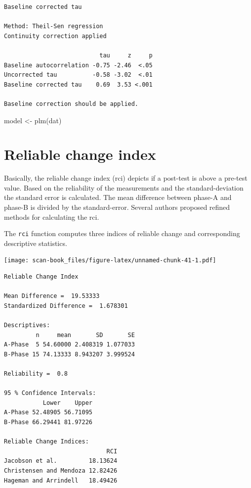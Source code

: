 \documentclass[
]{book}
\newenvironment{Shaded}{\begin{snugshade}}{\end{snugshade}}
\newcommand{\AttributeTok}[1]{\textcolor[rgb]{0.77,0.63,0.00}{#1}}
\newcommand{\ConstantTok}[1]{\textcolor[rgb]{0.00,0.00,0.00}{#1}}
\newcommand{\FloatTok}[1]{\textcolor[rgb]{0.00,0.00,0.81}{#1}}
\newcommand{\FunctionTok}[1]{\textcolor[rgb]{0.00,0.00,0.00}{#1}}
\newcommand{\NormalTok}[1]{#1}
\newcommand{\OtherTok}[1]{\textcolor[rgb]{0.56,0.35,0.01}{#1}}
\newcommand{\SpecialCharTok}[1]{\textcolor[rgb]{0.00,0.00,0.00}{#1}}
\begin{document}
\begin{verbatim}
Baseline corrected tau

Method: Theil-Sen regression
Continuity correction applied

                           tau     z     p
Baseline autocorrelation -0.75 -2.46  <.05
Uncorrected tau          -0.58 -3.02  <.01
Baseline corrected tau    0.69  3.53 <.001

Baseline correction should be applied.
\end{verbatim}

\begin{Shaded}
\begin{Highlighting}[]
\NormalTok{model }\OtherTok{\textless{}{-}} \FunctionTok{plm}\NormalTok{(dat)}
\end{Highlighting}
\end{Shaded}

\hypertarget{reliable-change-index}{%
\section{Reliable change index}\label{reliable-change-index}}

Basically, the reliable change index (rci) depicts if a post-test is above a pre-test value. Based on the reliability of the measurements and the standard-deviation the standard error is calculated. The mean difference between phase-A and phase-B is divided by the standard-error. Several authors proposed refined methods for calculating the rci.

The \texttt{rci} function computes three indices of reliable change \citep{wise_methods_2004} and corresponding descriptive statistics.

\begin{Shaded}
\end{Shaded}

\texttt{[image: scan-book\_files/figure-latex/unnamed-chunk-41-1.pdf]}

\begin{verbatim}
Reliable Change Index

Mean Difference =  19.53333 
Standardized Difference =  1.678301 

Descriptives:
         n     mean       SD       SE
A-Phase  5 54.60000 2.408319 1.077033
B-Phase 15 74.13333 8.943207 3.999524

Reliability =  0.8 

95 % Confidence Intervals:
           Lower    Upper
A-Phase 52.48905 56.71095
B-Phase 66.29441 81.97226

Reliable Change Indices:
                             RCI
Jacobson et al.         18.13624
Christensen and Mendoza 12.82426
Hageman and Arrindell   18.49426
\end{verbatim}
\end{document}
